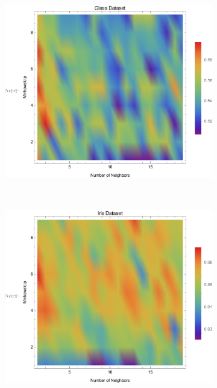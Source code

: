 \documentclass{article}
\begin{document}
\begin{figure}[h!]
\begin{subfigure}[b]{0.32\textwidth}
					\includegraphics[width=\textwidth]{figs/kNN/glass_plot_kp}
					\caption{}
					\label{kp_glass}					
				\end{subfigure} \	
				\begin{subfigure}[b]{0.32\textwidth}
					\centering
					\includegraphics[width=\textwidth]{figs/kNN/iris_plot_kp}	
					\caption{}
					\label{kp_iris}				
				\end{subfigure} \	
				\begin{subfigure}[b]{0.32\textwidth}
					\centering

\end{subfigure}
\end{figure}
\end{document}
